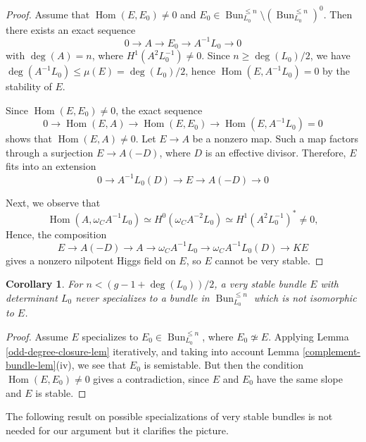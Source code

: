 \documentclass[12pt,reqno]{amsart}
\newtheorem{cor}[theorem]{Corollary}
\theoremstyle{definition}
\theoremstyle{remark}
\numberwithin{equation}{section}
\newcommand{\Hom}{\operatorname{Hom}}
\newcommand{\om}{\omega}
\newcommand{\Bun}{{\operatorname{Bun}}}
\begin{document}
\begin{proof}
Assume that $\Hom(E,E_0)\neq 0$ and $E_0\in \Bun_{L_0}^{\le n}\setminus (\Bun_{L_0}^{\le n})^0$. 
Then there exists an exact sequence
$$0\to A\to E_0\to A^{-1}L_0\to 0$$
with $\deg(A)=n$, where $H^1(A^2L_0^{-1})\neq 0$. Since $n\ge\deg(L_0)/2$, we have
$\deg(A^{-1}L_0)\le \mu(E)=\deg(L_0)/2$,
hence $\Hom(E,A^{-1}L_0)=0$ by the stability of $E$.

Since $\Hom(E,E_0)\neq 0$, the exact sequence
$$0\to \Hom(E,A)\to \Hom(E,E_0)\to \Hom(E,A^{-1}L_0)=0$$
shows that $\Hom(E,A)\neq 0$.
Let $E\to A$ be a nonzero map. Such a map factors through a  surjection $E\to A(-D)$, 
where $D$ is an effective divisor.
Therefore, $E$ fits into an extension
$$0\to A^{-1}L_0(D)\to E\to A(-D)\to 0$$

Next, we observe that
$$\Hom(A,\om_CA^{-1}L_0)\simeq H^0(\om_CA^{-2}L_0)\simeq H^1(A^2L_0^{-1})^*\neq 0,$$ 
Hence, the composition
$$E\to A(-D)\to A\to \om_CA^{-1}L_0\to \om_CA^{-1}L_0(D)\to KE$$
gives a nonzero nilpotent Higgs field on $E$, so $E$ cannot be very stable. 
\end{proof}

\begin{cor}\label{specialization-cor} For $n<(g-1+\deg(L_0))/2$, a very stable bundle $E$ with determinant $L_0$ 
never specializes to a bundle in $\Bun_{L_0}^{\le n}$ which is not isomorphic to $E$.
\end{cor}

\begin{proof} 
Assume $E$ specializes to $E_0\in \Bun_{L_0}^{\le n}$, where $E_0\not\simeq E$. Applying Lemma \ref{odd-degree-closure-lem} iteratively,
and taking into account Lemma \ref{complement-bundle-lem}(iv), we see that $E_0$ is semistable.
But then the condition $\Hom(E,E_0)\neq 0$ gives a contradiction, since $E$ and $E_0$ have the same slope and $E$ is stable.
\end{proof}

The following result on possible specializations of very stable bundles is not needed for our argument but it clarifies the picture.
\end{document}
